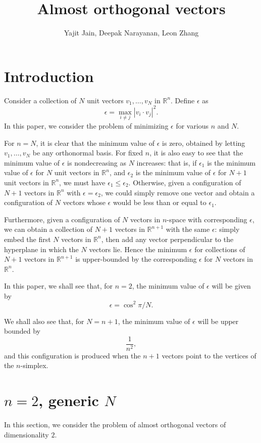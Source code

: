 \documentclass[11pt,letterpaper,twoside,english]{article}
\title{Almost orthogonal vectors}
\author{Yajit Jain, Deepak Narayanan, Leon Zhang}
\theoremstyle{theorem}
\theoremstyle{remark}
\begin{document}
\maketitle

\section{Introduction}
Consider a collection of $N$ unit vectors $v_1, \ldots, v_N$ in $\mathbb R^n$. Define $\epsilon$ as
\[\epsilon=\max_{i\neq j}|v_i\cdot v_j|^2.\]
In this paper, we consider the problem of minimizing $\epsilon$ for various $n$ and $N$.

For $n=N$, it is clear that the minimum value of $\epsilon$ is zero, obtained by letting $v_1,\ldots, v_N$ be any orthonormal basis. For fixed $n$, it is also easy to see that the minimum value of $\epsilon$ is nondecreasing as $N$ increases: that is, if $\epsilon_1$ is the minimum value of $\epsilon$ for $N$ unit vectors in $\mathbb R^n$, and $\epsilon_2$ is the minimum value of $\epsilon$ for $N+1$ unit vectors in $\mathbb R^n$, we must have $\epsilon_1\leq \epsilon_2$. Otherwise, given a configuration of $N+1$ vectors in $\mathbb R^n$ with $\epsilon=\epsilon_2$, we could simply remove one vector and obtain a configuration of $N$ vectors whose $\epsilon$ would be less than or equal to $\epsilon_1$.

Furthermore, given a configuration of $N$ vectors in $n$-space with corresponding $\epsilon$, we can obtain a collection of $N+1$ vectors in $\mathbb R^{n+1}$ with the same $\epsilon$: simply embed the first $N$ vectors in $\mathbb R^{n}$, then add any vector perpendicular to the hyperplane in which the $N$ vectors lie. Hence the minimum $\epsilon$ for collections of $N+1$ vectors in $\mathbb R^{n+1}$ is upper-bounded by the corresponding $\epsilon$ for $N$ vectors in $\mathbb R^n$.

In this paper, we shall see that, for $n=2$, the minimum value of $\epsilon$ will be given by 
\[\epsilon=\cos^2\pi/N.\] 

We shall also see that, for $N=n+1$, the minimum value of $\epsilon$ will be upper bounded by
\[\frac{1}{n^2},\] 
and this configuration is produced when the $n+1$ vectors point to the vertices of the $n$-simplex.

\section{$n=2$, generic $N$}
In this section, we consider the problem of almost orthogonal vectors of dimensionality $2$.
\end{document}
